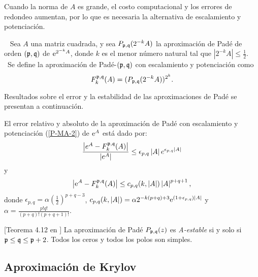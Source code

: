 Cuando la norma de   $A$ es grande, el costo computacional y los errores de redondeo  aumentan, por lo que
es necesaria la alternativa de escalamiento y potenciación.

\begin{definition}\cite{golub2013matrix}~
    Sea $A$ una matriz cuadrada, y sea $P_{\pf,\qf}(2^{-k}A%
    )$ la aproximación de Padé de orden $(\mathfrak{p},\mathfrak{q})\ $de $\me{2^{-k}A%
    }$, donde $k$ es el menor número natural tal que $\left\vert 2^{-k}A%
    \right\vert \leq \frac{1}{2}$. \ Se define la aproximación de  Padé-$(\mathfrak{p},\mathfrak{q})$ con escalamiento y potenciación como 
    \begin{equation}
    F_{k}^{\mathfrak{p},\mathfrak{q}}(A)=(P_{\mathfrak{p},\mathfrak{q}}(2^{-k}A))^{2^{k}}.
    \label{P-MA-2}
    \end{equation}
\end{definition}

Resultados sobre el error y la estabilidad de las aproximaciones de Padé se presentan a continuación.

\begin{theorem}
    \label{Conv. Pade}\cite{jimenez2012convergence} El error
    relativo y absoluto de la aproximación de Padé con escalamiento y
    potenciación (\ref{P-MA-2}) de $\mathrm{e}^{A}$ está dado por: 
    \[
    \frac{\left\vert e^{A}-F_{k}^{\mathfrak{p},\mathfrak{q}}(A)\right\vert 
    }{\left\vert e^{A}\right\vert }\leq \epsilon _{p,q}\left\vert 
    A\right\vert e^{\epsilon _{p,q}\left\vert A\right\vert }
    \]%
    y 
    \begin{equation}
    \left\vert \mathrm{e}^{A}-F_{k}^{\mathfrak{p},\mathfrak{q}}(A)\right\vert \leq
    c_{p,q}(k,\left\vert A\right\vert )\left\vert A\right\vert
    ^{p+q+1}, \label{errpade}
    \end{equation}
    donde $\epsilon _{p,q}=\alpha (\frac{1}{2})^{p+q-3}$, $%
    c_{p,q}(k,\left\vert A\right\vert )=\alpha
    2^{-k(p+q)+3}\me{(1+\epsilon _{p,q})\left\vert A\right\vert }$ y $%
    \alpha =\frac{p!q!}{(p+q)!(p+q+1)!}$.
\end{theorem}

\begin{theorem}\label{Stab. Pade}[Teorema 4.12 en \cite{wanner1996solving}] 
    La aproximación de Padé $P_{\mathfrak{p},\mathfrak{q}}(z)$  es \emph{A-estable} si y solo si $\mathfrak{p}\leq \mathfrak{q}\leq \mathfrak{p}+2$. 
    Todos los ceros y todos los polos son simples.
\end{theorem}

\subsection{Aproximación de Krylov}

